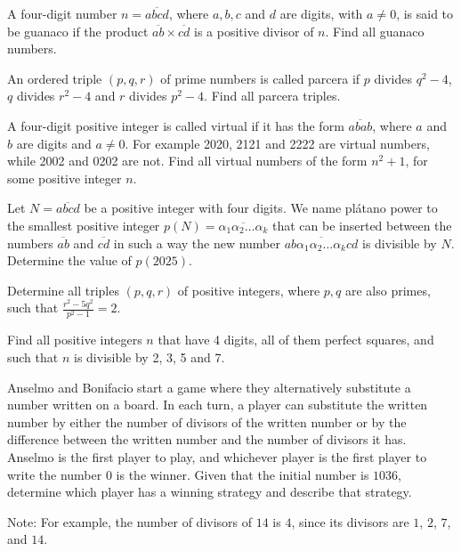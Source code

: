 \documentclass[11pt]{scrartcl}
\begin{document}
\begin{problem} [Centro 2023/4]
A four-digit number $n=\overline{a b c d}$, where $a, b, c$ and $d$ are digits, with $a \neq 0$, is said to be guanaco if the product $\overline{a b} \times \overline{c d}$ is a positive divisor of $n$. Find all guanaco numbers.
\end{problem}

\begin{problem} [Centro 2021/1]
An ordered triple $(p, q, r)$ of prime numbers is called parcera if $p$ divides $q^2-4$, $q$ divides $r^2-4$ and $r$ divides $p^2-4$. Find all parcera triples.
\end{problem}

\begin{problem} [Centro 2020/1]
A four-digit positive integer is called virtual if it has the form $\overline{abab}$, where $a$ and $b$ are digits and $a \neq 0$. For example 2020, 2121 and 2222 are virtual numbers, while 2002 and 0202 are not. Find all virtual numbers of the form $n^2+1$, for some positive integer $n$.
\end{problem}

\begin{problem}[Centro 2019/1]
Let $N=\overline{abcd}$ be a positive integer with four digits. We name plátano power to the smallest positive integer $p(N)=\overline{\alpha_1\alpha_2\ldots\alpha_k}$ that can be inserted between the numbers $\overline{ab}$ and $\overline{cd}$ in such a way the new number $\overline{ab\alpha_1\alpha_2\ldots\alpha_kcd}$ is divisible by $N$. Determine the value of $p(2025)$.
\end{problem}

\begin{problem}[Centro 2018/4]
Determine all triples $(p, q, r)$ of positive integers, where $p, q$ are also primes, such that $\frac{r^2-5q^2}{p^2-1}=2$.
\end{problem}

\begin{problem}[Centro 2016/1]
	Find all positive integers $n$ that have 4 digits, all of them perfect squares, and such that $n$ is divisible by 2, 3, 5 and 7.
\end{problem}

\begin{problem}[Centro 2015/4]
	Anselmo and Bonifacio start a game where they alternatively substitute a number written on a board. In each turn, a player can substitute the written number by either the number of divisors of the written number or by the difference between the written number and the number of divisors it has. Anselmo is the first player to play, and whichever player is the first player to write the number $0$ is the winner. Given that the initial number is $1036$, determine which player has a winning strategy and describe that strategy.

Note: For example, the number of divisors of $14$ is $4$, since its divisors are $1$, $2$, $7$, and $14$.
\end{problem}
\end{document}
